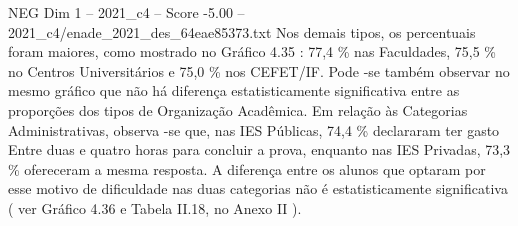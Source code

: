 \begin{textsample}{NEG Dim 1 – 2021\_c4 – Score -5.00 – 2021\_c4/enade\_2021\_des\_64eae85373.txt}
Nos demais tipos, os percentuais foram maiores, como mostrado no Gráfico 4.35 : 77,4 \% nas Faculdades, 75,5 \% no Centros Universitários e 75,0 \% nos CEFET/IF.
Pode -se também observar no mesmo gráfico que não há diferença estatisticamente significativa entre as proporções dos tipos de Organização Acadêmica.
Em relação às Categorias Administrativas, observa -se que, nas IES Públicas, 74,4 \% declararam ter gasto Entre duas e quatro horas para concluir a prova, enquanto nas IES Privadas, 73,3 \% ofereceram a mesma resposta.
A diferença entre os alunos que optaram por esse motivo de dificuldade nas duas categorias não é estatisticamente significativa ( ver Gráfico 4.36 e Tabela II.18, no Anexo II ).

\end{textsample}
